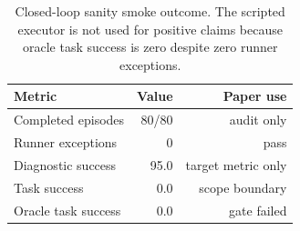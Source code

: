 \begin{table}[t]
\centering
\caption{Closed-loop sanity smoke outcome. The scripted executor is not used for positive claims because oracle task success is zero despite zero runner exceptions.}
\label{tab:scirep-closed-loop-smoke}
\scriptsize
\begin{tabular}{lrr}
\toprule
Metric & Value & Paper use \\
\midrule
Completed episodes & 80/80 & audit only \\
Runner exceptions & 0 & pass \\
Diagnostic success & 95.0 & target metric only \\
Task success & 0.0 & scope boundary \\
Oracle task success & 0.0 & gate failed \\
\bottomrule
\end{tabular}
\end{table}
